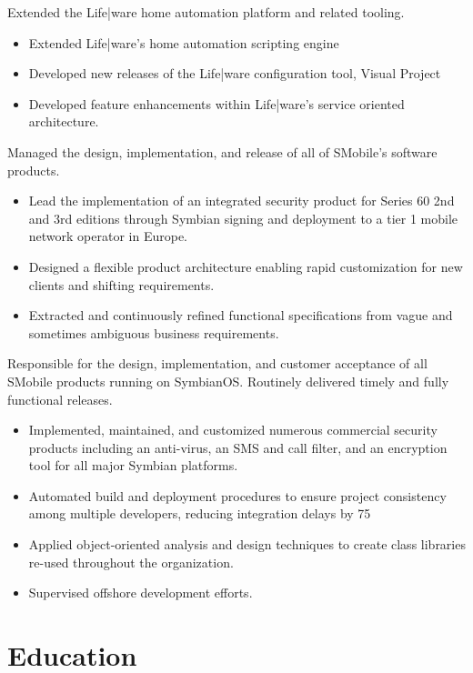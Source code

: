 \documentclass[12pt,letter,sans]{moderncv}
\begin{document}

Extended the Life|ware home automation platform and related tooling.

\begin{itemize}
    \item Extended Life|ware's home automation scripting engine
    \item Developed new releases of the Life|ware configuration tool, Visual Project
    \item Developed feature enhancements within Life|ware's service oriented architecture.
\end{itemize}

 {}{}

Managed the design, implementation, and release of all of SMobile’s software
products.

\begin{itemize}

    \item Lead the implementation of an integrated security product for Series
        60 2nd and 3rd editions through Symbian signing and deployment to a tier
        1 mobile network operator in Europe.

    \item Designed a flexible product architecture enabling rapid customization
        for new clients and shifting requirements.

    \item Extracted and continuously refined functional specifications from vague
        and sometimes ambiguous business requirements.

\end{itemize}


Responsible for the design, implementation, and customer acceptance of all
SMobile products running on SymbianOS.  Routinely delivered timely and fully
functional releases.

\begin{itemize}

    \item Implemented, maintained, and customized numerous commercial security
        products including an anti-virus, an SMS and call filter, and an
        encryption tool for all major Symbian platforms.

    \item Automated build and deployment procedures to ensure project
        consistency among multiple developers, reducing integration delays by
        75%

    \item Applied object-oriented analysis and design techniques to create class
        libraries re-used throughout the organization.

    \item Supervised offshore development efforts.

\end{itemize}

\section{Education}

\end{document}
